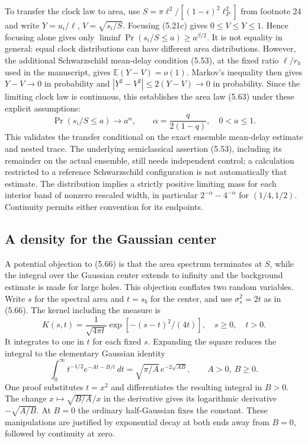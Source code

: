 \documentclass[11pt]{article}
\newcommand{\Prob}{\operatorname{Pr}}
\newcommand{\E}{\mathbb E}
\begin{document}
To transfer the clock law to area, use $S=\pi\ell^2/[(1-\epsilon)^2\ell_P^2]$ from footnote 24 and write $Y=u_i/\ell$, $V=\sqrt{s_i/S}$. Focusing (5.21c) gives $0\le V\le Y\le1$. Hence focusing alone gives only $\liminf\Prob(s_i/S\le a)\ge a^{\beta/2}$. It is not equality in general: equal clock distributions can have different area distributions. However, the additional Schwarzschild mean-delay condition (5.53), at the fixed ratio $\ell/r_h$ used in the manuscript, gives $\E(Y-V)=o(1)$. Markov's inequality then gives $Y-V\to0$ in probability and $|Y^2-V^2|\le2(Y-V)\to0$ in probability. Since the limiting clock law is continuous, this establishes the area law (5.63) under these explicit assumptions:
\begin{equation}\label{eq:cdf}
 \Prob(s_i/S\le a)\longrightarrow a^\alpha,\qquad
 \alpha=\frac{q}{2(1-q)},\quad 0<a\le1 .
\end{equation}
This validates the transfer conditional on the exact ensemble mean-delay estimate and nested trace. The underlying semiclassical assertion (5.53), including its remainder on the actual ensemble, still needs independent control; a calculation restricted to a reference Schwarzschild configuration is not automatically that estimate. The distribution implies a strictly positive limiting mass for each interior band of nonzero rescaled width, in particular $2^{-\alpha}-4^{-\alpha}$ for $(1/4,1/2)$. Continuity permits either convention for its endpoints.

\subsection{A density for the Gaussian center}
A potential objection to (5.66) is that the area spectrum terminates at $S$, while the integral over the Gaussian center extends to infinity and the background estimate is made for large holes. This objection conflates two random variables. Write $s$ for the spectral area and $t=s_b$ for the center, and use $\sigma_s^2=2t$ as in (5.66). The kernel including the measure is
\begin{equation}\label{eq:kernel}
 K(s,t)=\frac{1}{\sqrt{4\pi t}}\exp[-(s-t)^2/(4t)],\quad s\ge0,\quad t>0 .
\end{equation}
It integrates to one in $t$ for each fixed $s$. Expanding the square reduces the integral to the elementary Gaussian identity
\[
 \int_0^\infty t^{-1/2}e^{-At-B/t}\,dt
     =\sqrt{\pi/A}\,e^{-2\sqrt{AB}},\qquad A>0,\ B\ge0 .
\]
One proof substitutes $t=x^2$ and differentiates the resulting integral in $B>0$. The change $x\mapsto\sqrt{B/A}/x$ in the derivative gives its logarithmic derivative $-\sqrt{A/B}$. At $B=0$ the ordinary half-Gaussian fixes the constant. These manipulations are justified by exponential decay at both ends away from $B=0$, followed by continuity at zero.
\end{document}
